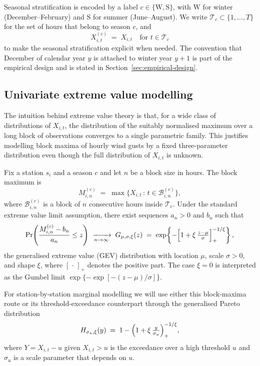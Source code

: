 Seasonal stratification is encoded by a label \(c \in \{\mathrm{W},
\mathrm{S}\}\), with \(\mathrm{W}\) for winter (December--February)
and \(\mathrm{S}\) for summer (June--August). We write
\(\mathcal{T}_c \subset \{1,\dots,T\}\) for the set of hours that
belong to season \(c\), and
\[
    X^{(c)}_{i,t} \;=\; X_{i,t}\quad\text{for } t \in \mathcal{T}_c
\]
to make the seasonal stratification explicit when needed. The
convention that December of calendar year \(y\) is attached to
winter year \(y+1\) is part of the empirical design and is stated in
Section~\ref{sec:empirical-design}.

\subsection{Univariate extreme value modelling}
\label{sec:evt-univariate}

The intuition behind extreme value theory is that, for a wide class
of distributions of \(X_{i,t}\), the distribution of the suitably
normalised maximum over a long block of observations converges to a
single parametric family. This justifies modelling block maxima of
hourly wind gusts by a fixed three-parameter distribution even though
the full distribution of \(X_{i,t}\) is unknown.

Fix a station \(s_i\) and a season \(c\) and let \(n\) be a block
size in hours. The block maximum is
\[
    M^{(c)}_{i,n} \;=\; \max\!\bigl\{ X_{i,t}\,:\, t \in
    \mathcal{B}^{(c)}_{i,n}\bigr\},
\]
where \(\mathcal{B}^{(c)}_{i,n}\) is a block of \(n\) consecutive
hours inside \(\mathcal{T}_c\). Under the standard extreme value
limit assumption, there exist sequences \(a_n>0\) and \(b_n\) such
that
\[
    \Pr\!\left( \frac{M^{(c)}_{i,n} - b_n}{a_n} \le z \right)
    \;\xrightarrow[n\to\infty]{}\;
    G_{\mu,\sigma,\xi}(z)
    \;=\;
    \exp\!\left\{-\Bigl[1 + \xi\,\tfrac{z-\mu}{\sigma}\Bigr]_{+}^{-1/\xi}\right\},
\]
the generalised extreme value (GEV) distribution with location
\(\mu\), scale \(\sigma>0\), and shape \(\xi\), where
\([\,\cdot\,]_{+}\) denotes the positive part. The case \(\xi=0\) is
interpreted as the Gumbel limit \(\exp\{-\exp[-(z-\mu)/\sigma]\}\).

For station-by-station marginal modelling we will use either this
block-maxima route or its threshold-exceedance counterpart through
the generalised Pareto distribution
\[
    H_{\sigma_u,\xi}(y) \;=\; 1 - \Bigl(1 + \xi\,\tfrac{y}{\sigma_u}\Bigr)_{+}^{-1/\xi},
\]
where \(Y = X_{i,t} - u\) given \(X_{i,t} > u\) is the exceedance
over a high threshold \(u\) and \(\sigma_u\) is a scale parameter
that depends on \(u\).


